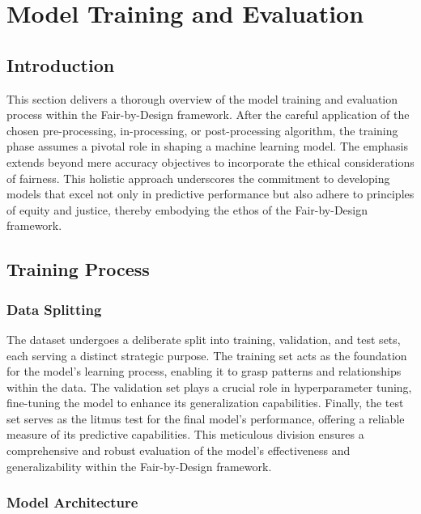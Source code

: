 \documentclass[12pt,a4paper,openright,twoside]{book}
\begin{document}
\section{Model Training and Evaluation}
\label{section:model-training}

\subsection{Introduction}

This section delivers a thorough overview of the model training and evaluation process within the Fair-by-Design framework. After the careful application of the chosen pre-processing, in-processing, or post-processing algorithm, the training phase assumes a pivotal role in shaping a machine learning model. The emphasis extends beyond mere accuracy objectives to incorporate the ethical considerations of fairness. This holistic approach underscores the commitment to developing models that excel not only in predictive performance but also adhere to principles of equity and justice, thereby embodying the ethos of the Fair-by-Design framework.

\subsection{Training Process}

\subsubsection{Data Splitting}

The dataset undergoes a deliberate split into training, validation, and test sets, each serving a distinct strategic purpose. The training set acts as the foundation for the model's learning process, enabling it to grasp patterns and relationships within the data. The validation set plays a crucial role in hyperparameter tuning, fine-tuning the model to enhance its generalization capabilities. Finally, the test set serves as the litmus test for the final model's performance, offering a reliable measure of its predictive capabilities. This meticulous division ensures a comprehensive and robust evaluation of the model's effectiveness and generalizability within the Fair-by-Design framework.

\subsubsection{Model Architecture}
\end{document}
